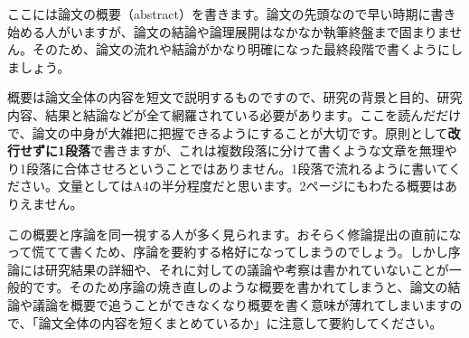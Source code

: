 ここには論文の概要（abstract）を書きます。論文の先頭なので早い時期に書き始める人がいますが、論文の結論や論理展開はなかなか執筆終盤まで固まりません。そのため、論文の流れや結論がかなり明確になった最終段階で書くようにしましょう。

概要は論文全体の内容を短文で説明するものですので、研究の背景と目的、研究内容、結果と結論などが全て網羅されている必要があります。ここを読んだだけで、論文の中身が大雑把に把握できるようにすることが大切です。原則として\textbf{改行せずに1段落}で書きますが、これは複数段落に分けて書くような文章を無理やり1段落に合体させろということではありません。1段落で流れるように書いてください。文量としてはA4の半分程度だと思います。2ページにもわたる概要はありえません。

この概要と序論を同一視する人が多く見られます。おそらく修論提出の直前になって慌てて書くため、序論を要約する格好になってしまうのでしょう。しかし序論には研究結果の詳細や、それに対しての議論や考察は書かれていないことが一般的です。そのため序論の焼き直しのような概要を書かれてしまうと、論文の結論や議論を概要で追うことができなくなり概要を書く意味が薄れてしまいますので、「論文全体の内容を短くまとめているか」に注意して要約してください。
